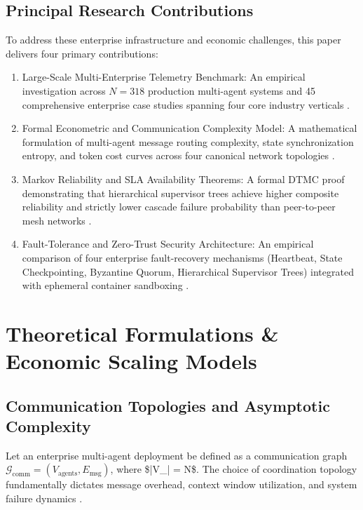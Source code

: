 \documentclass[10pt,twocolumn,letterpaper]{article}
\begin{document}
\subsection{Principal Research Contributions}


To address these enterprise infrastructure and economic challenges, this paper delivers four primary contributions:
\begin{enumerate}
  \item Large-Scale Multi-Enterprise Telemetry Benchmark: An empirical investigation across $N = 318$ production multi-agent systems and 45 comprehensive enterprise case studies spanning four core industry verticals \cite{crossref_10_1201_9788743808145_14}.
  \item Formal Econometric and Communication Complexity Model: A mathematical formulation of multi-agent message routing complexity, state synchronization entropy, and token cost curves across four canonical network topologies \cite{arxiv_2404_01131,arxiv_2203_08975}.
  \item Markov Reliability and SLA Availability Theorems: A formal DTMC proof demonstrating that hierarchical supervisor trees achieve higher composite reliability and strictly lower cascade failure probability than peer-to-peer mesh networks \cite{arxiv_2010_11146,arxiv_2412_06333}.
  \item Fault-Tolerance and Zero-Trust Security Architecture: An empirical comparison of four enterprise fault-recovery mechanisms (Heartbeat, State Checkpointing, Byzantine Quorum, Hierarchical Supervisor Trees) integrated with ephemeral container sandboxing \cite{arxiv_2404_04289,openalex_w4400578758}.
\end{enumerate}




\section{Theoretical Formulations \& Economic Scaling Models}



\subsection{Communication Topologies and Asymptotic Complexity}


Let an enterprise multi-agent deployment be defined as a communication graph $\mathcal{G}_{\text{comm}} = (V_{\text{agents}}, E_{\text{msg}})$, where \$|V\_{}| = N\$. The choice of coordination topology fundamentally dictates message overhead, context window utilization, and system failure dynamics \cite{arxiv_2203_08975}.
\end{document}
